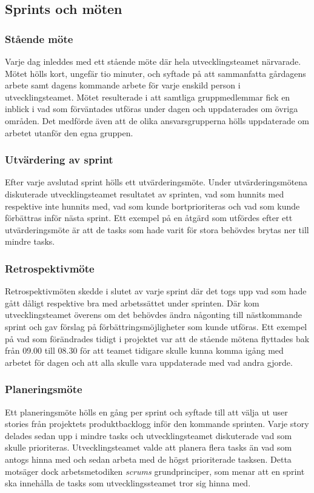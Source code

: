 \documentclass[a4paper,12pt,oneside,final]{extbook}
\begin{document}
\subsection{Sprints och möten}
\subsubsection{Stående möte}
Varje dag inleddes med ett stående möte där hela utvecklingsteamet närvarade. Mötet hölls kort, ungefär tio minuter, och syftade på att sammanfatta gårdagens arbete samt dagens kommande arbete för varje enskild person i utvecklingsteamet. Mötet resulterade i att samtliga gruppmedlemmar fick en inblick i vad som förväntades utföras under dagen och uppdaterades om övriga områden. Det medförde även att de olika ansvarsgrupperna hölls uppdaterade om arbetet utanför den egna gruppen.

\subsubsection{Utvärdering av sprint}
Efter varje avslutad sprint hölls ett utvärderingsmöte. Under utvärderingsmötena diskuterade utvecklingsteamet resultatet av sprinten, vad som hunnits med respektive inte hunnits med, vad som kunde bortprioriteras och vad som kunde förbättras inför nästa sprint. Ett exempel på en åtgärd som utfördes efter ett utvärderingsmöte är att de tasks som hade varit för stora behövdes brytas ner till mindre tasks.

\subsubsection{Retrospektivmöte}
Retrospektivmöten skedde i slutet av varje sprint där det togs upp vad som hade gått dåligt respektive bra med arbetssättet under sprinten. Där kom utvecklingsteamet överens om det behövdes ändra någonting till nästkommande sprint och gav förslag på förbättringsmöjligheter som kunde utföras. Ett exempel på vad som förändrades tidigt i projektet var att de stående mötena flyttades bak från 09.00 till 08.30 för att teamet tidigare skulle kunna komma igång med arbetet för dagen och att alla skulle vara uppdaterade med vad andra gjorde.

\subsubsection{Planeringsmöte}
Ett planeringsmöte hölls en gång per sprint och syftade till att välja ut user stories från projektets produktbacklogg inför den kommande sprinten. Varje story delades sedan upp i mindre tasks och utvecklingsteamet diskuterade vad som skulle prioriteras. Utvecklingsteamet valde att planera flera tasks än vad som antogs hinna med och sedan arbeta med de högst prioriterade tasksen. Detta motsäger dock arbetsmetodiken \emph{scrums} grundprinciper, som menar att en sprint ska innehålla de tasks som utvecklingssteamet tror sig hinna med.
\end{document}

